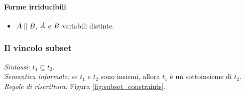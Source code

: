 \documentclass[12pt,a4paper,openright]{book}  %
\begin{document}
\paragraph{Forme irriducibili}
\begin{itemize}
	\item $\dot{A} \mid\mid \dot{B}$, $\dot{A}$ e $\dot{B}$ variabili distinte.
\end{itemize}


\subsubsection{Il vincolo subset}

\textit{Sintassi:} $t_1 \subseteq t_2$.\\
\noindent\textit{Semantica informale:} se $t_1$ e $t_2$ sono insiemi, allora $t_1$ è un sottoinsieme di $t_2$.\\
\noindent\textit{Regole di riscrittura:} Figura \ref{fig:subset_constraints}.
\end{document}
